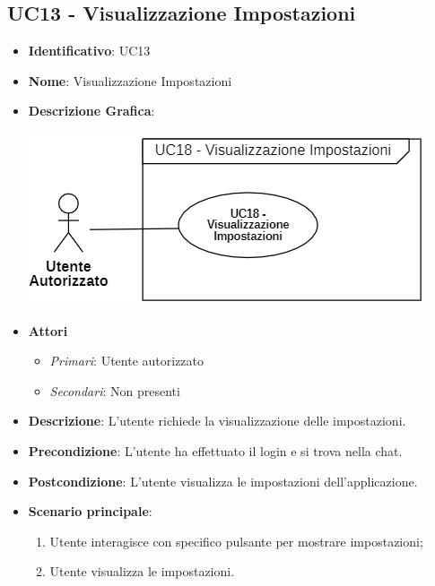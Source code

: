 \subsection{UC13 - Visualizzazione Impostazioni}
\begin{itemize}
	\item \textbf{Identificativo}: UC13
	\item \textbf{Nome}: Visualizzazione Impostazioni
	\item\textbf{Descrizione Grafica}: 
	\begin{center}
		\includegraphics[scale=0.80]{images/UC13.png} 
	\end{center}

	\item \textbf{Attori}
	\begin{itemize} 
		\item \textit{Primari}: Utente autorizzato
		\item \textit{Secondari}: Non presenti
	\end{itemize}
	\item \textbf{Descrizione}: L'utente richiede la visualizzazione delle impostazioni.
	\item \textbf{Precondizione}: L'utente ha effettuato il login e si trova nella chat.
	\item \textbf{Postcondizione}: L'utente visualizza le impostazioni dell'applicazione.
	\item \textbf{Scenario principale}: \begin{enumerate}
		\item Utente interagisce con specifico pulsante per mostrare impostazioni;
		\item Utente visualizza le impostazioni.
	\end{enumerate}
\end{itemize}
